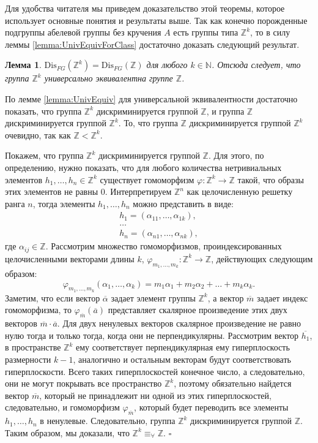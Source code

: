 \documentclass[a4paper,11pt,twoside]{article}
\newtheorem{lemma}{Лемма}[section]
\def\proof{{\noindent{\bf Доказательство.}} }
\def\Z{{\mathbb{Z}}}
\def\N{{\mathbb{N}}}
\def\Dis{{\mathrm{Dis}}}
\begin{document}
Для удобства читателя мы приведем доказательство этой теоремы, которое использует основные понятия и результаты выше. Так как конечно порожденные подгруппы абелевой группы без кручения $A$ есть группы типа $\Z^k$, то в силу леммы \ref{lemma:UnivEquivForClass} достаточно доказать следующий результат.

\begin{lemma}\label{lemma:UnivEquivZk}
$\Dis_{FG}(\Z^k) = \Dis_{FG}(\Z)$ для любого $k \in \N$. Отсюда следует, что группа $\Z^k$ универсально эквивалентна группе $\Z$.
\end{lemma}

\proof По лемме \ref{lemma:UnivEquiv} для универсальной эквивалентности достаточно показать, что группа $\Z^k$ дискриминируется группой $\Z$, и группа $\Z$ дискриминируется группой $\Z^k$. То, что группа $\Z$ дискриминируется группой $\Z^k$ очевидно, так как $\Z < \Z^k$. 

Покажем, что группа $\Z^k$ дискриминируется группой $\Z$. Для этого, по определению, нужно показать, что для любого количества нетривиальных элементов $h_1, \ldots, h_n \in \Z^k$ существует гомоморфизм $\varphi : \Z^k \rightarrow \Z$ такой, что образы этих элементов не равны 0. Интерпретируем $\Z^n$ как целочисленную решетку ранга $n$, тогда элементы $h_1, \ldots, h_n$ можно представить в виде:
$$\begin{array}{c}
 h_1 = (\alpha_{11}, \ldots, \alpha_{1k}), \\
 \ldots \\
 h_n = (\alpha_{n1}, \ldots, \alpha_{nk}),
 \end{array} $$
где $\alpha_{ij} \in \Z$. Рассмотрим множество гомоморфизмов, проиндексированных целочисленными векторами длины $k$, $\varphi_{m_1,\ldots,m_k} : \Z^k \rightarrow \Z$, действующих следующим образом:
$$\varphi_{m_1,\ldots,m_k} (\alpha_1, \ldots, \alpha_k) = m_1 \alpha_1 + m_2 \alpha_2 + \ldots + m_k \alpha_k.$$
Заметим, что если вектор $\overline{\alpha}$ задает элемент группы $\Z^k$, а вектор $\overline{m}$ задает индекс гомоморфизма, то $\varphi_{\overline{m}}(\overline{a})$ представляет скалярное произведение этих двух векторов $\overline{m} \cdot \overline{a}$. Для двух ненулевых векторов скалярное произведение не равно нулю тогда и только тогда, когда они не перпендикулярны. Рассмотрим вектор $\overline{h_1}$, в пространстве $\Z^k$ ему соответствует перпендикулярная ему гиперплоскость размерности $k-1$, аналогично и остальным векторам будут соответствовать гиперплоскости. Всего таких гиперплоскостей конечное число, а следовательно, они не могут покрывать все пространство $\Z^k$, поэтому обязательно найдется вектор $\overline{m}$, который не принадлежит ни одной из этих гиперплоскостей, следовательно, и гомоморфизм $\varphi_{\overline{m}}$, который будет переводить все элементы $h_1,\ldots, h_n$ в ненулевые. Следовательно, группа $\Z^k$ дискриминируется группой $\Z$. Таким образом, мы доказали, что $\Z^k \equiv_{\forall} \Z$. $\square$
\end{document}
